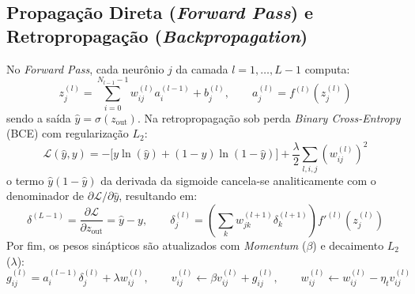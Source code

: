 \subsection{Propagação Direta (\textit{Forward Pass}) e Retropropagação (\textit{Backpropagation})}
No \textit{Forward Pass}, cada neurônio $j$ da camada $l = 1, \dots, L-1$ computa:
\begin{equation}
    z_j^{(l)} = \sum_{i=0}^{N_{l-1}-1} w_{ij}^{(l)} a_i^{(l-1)} + b_j^{(l)}, \qquad a_j^{(l)} = f^{(l)}\!\left(z_j^{(l)}\right)
\end{equation}
sendo a saída $\hat{y} = \sigma(z_{\text{out}})$. Na retropropagação sob perda \textit{Binary Cross-Entropy} (BCE) com regularização $L_2$:
\begin{equation}
    \mathcal{L}(\hat{y}, y) = -\Big[y \ln(\hat{y}) + (1 - y)\ln(1 - \hat{y})\Big] + \frac{\lambda}{2}\sum_{l,i,j}\left(w_{ij}^{(l)}\right)^2
\end{equation}
o termo $\hat{y}(1-\hat{y})$ da derivada da sigmoide cancela-se analiticamente com o denominador de $\partial \mathcal{L}/\partial \hat{y}$, resultando em:
\begin{equation}
    \delta^{(L-1)} = \frac{\partial \mathcal{L}}{\partial z_{\text{out}}} = \hat{y} - y, \qquad \delta_j^{(l)} = \left(\sum_{k} w_{jk}^{(l+1)} \delta_k^{(l+1)}\right) f'^{(l)}\!\left(z_j^{(l)}\right)
\end{equation}
Por fim, os pesos sinápticos são atualizados com \textit{Momentum} ($\beta$) e decaimento $L_2$ ($\lambda$):
\begin{equation}
    g_{ij}^{(l)} = a_i^{(l-1)}\delta_j^{(l)} + \lambda w_{ij}^{(l)}, \qquad v_{ij}^{(l)} \leftarrow \beta v_{ij}^{(l)} + g_{ij}^{(l)}, \qquad w_{ij}^{(l)} \leftarrow w_{ij}^{(l)} - \eta_t v_{ij}^{(l)}
\end{equation}
